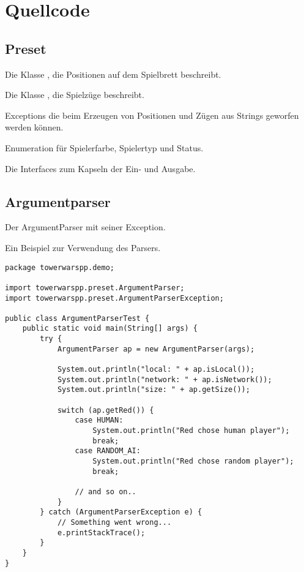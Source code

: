 \section*{Quellcode}
\subsection*{Preset}
Die Klasse , die Positionen auf dem Spielbrett beschreibt.


Die Klasse , die Spielzüge beschreibt.


Exceptions die beim Erzeugen von Positionen und Zügen aus Strings geworfen werden können.

 \newpage

Enumeration für Spielerfarbe, Spielertyp und Status.




Die Interfaces zum Kapseln der Ein- und Ausgabe.




\newpage
\subsection*{Argumentparser}
Der ArgumentParser mit seiner Exception.



\newpage
Ein Beispiel zur Verwendung des Parsers.
\begin{lstlisting}
package towerwarspp.demo;

import towerwarspp.preset.ArgumentParser;
import towerwarspp.preset.ArgumentParserException;

public class ArgumentParserTest {
    public static void main(String[] args) {
        try {
            ArgumentParser ap = new ArgumentParser(args);

            System.out.println("local: " + ap.isLocal());
            System.out.println("network: " + ap.isNetwork());
            System.out.println("size: " + ap.getSize());

            switch (ap.getRed()) {
                case HUMAN:
                    System.out.println("Red chose human player");
                    break;
                case RANDOM_AI:
                    System.out.println("Red chose random player");
                    break;

                // and so on..
            }
        } catch (ArgumentParserException e) {
            // Something went wrong...
            e.printStackTrace();
        }
    }
}

\end{lstlisting}

